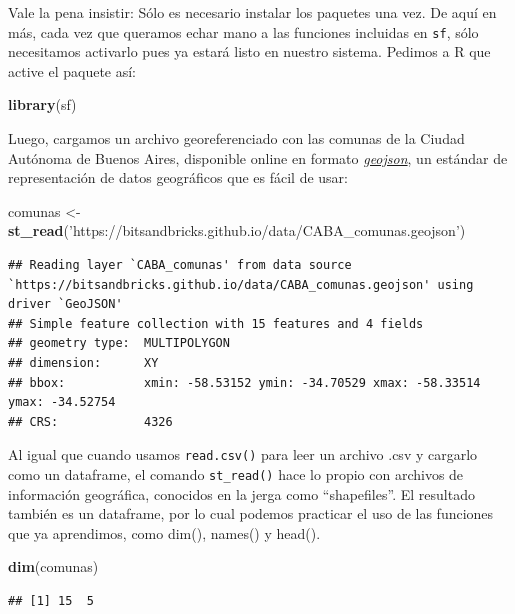 \documentclass[spanish,]{book}
\newenvironment{Shaded}{\begin{snugshade}}{\end{snugshade}}
\newcommand{\KeywordTok}[1]{\textcolor[rgb]{0.13,0.29,0.53}{\textbf{#1}}}
\newcommand{\NormalTok}[1]{#1}
\newcommand{\StringTok}[1]{\textcolor[rgb]{0.31,0.60,0.02}{#1}}
\begin{document}
Vale la pena insistir: Sólo es necesario instalar los paquetes una vez. De aquí en más, cada vez que queramos echar mano a las funciones incluidas en \texttt{sf}, sólo necesitamos activarlo pues ya estará listo en nuestro sistema. Pedimos a R que active el paquete así:

\begin{Shaded}
\begin{Highlighting}[]
\KeywordTok{library}\NormalTok{(sf)}
\end{Highlighting}
\end{Shaded}

Luego, cargamos un archivo georeferenciado con las comunas de la Ciudad Autónoma de Buenos Aires, disponible online en formato \href{https://es.wikipedia.org/wiki/GeoJSON}{\emph{geojson}}, un estándar de representación de datos geográficos que es fácil de usar:

\begin{Shaded}
\begin{Highlighting}[]
\NormalTok{comunas <-}\StringTok{ }\KeywordTok{st_read}\NormalTok{(}\StringTok{'https://bitsandbricks.github.io/data/CABA_comunas.geojson'}\NormalTok{)}
\end{Highlighting}
\end{Shaded}

\begin{verbatim}
## Reading layer `CABA_comunas' from data source `https://bitsandbricks.github.io/data/CABA_comunas.geojson' using driver `GeoJSON'
## Simple feature collection with 15 features and 4 fields
## geometry type:  MULTIPOLYGON
## dimension:      XY
## bbox:           xmin: -58.53152 ymin: -34.70529 xmax: -58.33514 ymax: -34.52754
## CRS:            4326
\end{verbatim}

Al igual que cuando usamos \texttt{read.csv()} para leer un archivo .csv y cargarlo como un dataframe, el comando \texttt{st\_read()} hace lo propio con archivos de información geográfica, conocidos en la jerga como ``shapefiles''. El resultado también es un dataframe, por lo cual podemos practicar el uso de las funciones que ya aprendimos, como dim(), names() y head().

\begin{Shaded}
\begin{Highlighting}[]
\KeywordTok{dim}\NormalTok{(comunas)}
\end{Highlighting}
\end{Shaded}

\begin{verbatim}
## [1] 15  5
\end{verbatim}
\end{document}
